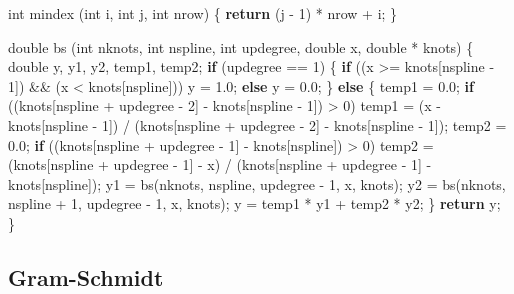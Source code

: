 \documentclass[
  12pt,
]{book}
\newenvironment{Shaded}{\begin{snugshade}}{\end{snugshade}}
\newcommand{\ControlFlowTok}[1]{\textcolor[rgb]{0.13,0.29,0.53}{\textbf{#1}}}
\newcommand{\DataTypeTok}[1]{\textcolor[rgb]{0.13,0.29,0.53}{#1}}
\newcommand{\DecValTok}[1]{\textcolor[rgb]{0.00,0.00,0.81}{#1}}
\newcommand{\FloatTok}[1]{\textcolor[rgb]{0.00,0.00,0.81}{#1}}
\newcommand{\NormalTok}[1]{#1}
\begin{document}
\begin{Shaded}
\begin{Highlighting}[]
\DataTypeTok{int}\NormalTok{ mindex (}\DataTypeTok{int}\NormalTok{ i, }\DataTypeTok{int}\NormalTok{ j, }\DataTypeTok{int}\NormalTok{ nrow) \{}
    \ControlFlowTok{return}\NormalTok{ (j {-} }\DecValTok{1}\NormalTok{) * nrow + i;}
\NormalTok{\}}

\DataTypeTok{double}\NormalTok{ bs (}\DataTypeTok{int}\NormalTok{ nknots, }\DataTypeTok{int}\NormalTok{ nspline, }\DataTypeTok{int}\NormalTok{ updegree, }\DataTypeTok{double}\NormalTok{ x, }\DataTypeTok{double}\NormalTok{ * knots) \{}
    \DataTypeTok{double}\NormalTok{ y, y1, y2, temp1, temp2;}
     \ControlFlowTok{if}\NormalTok{ (updegree == }\DecValTok{1}\NormalTok{) \{}
        \ControlFlowTok{if}\NormalTok{ ((x \textgreater{}= knots[nspline {-} }\DecValTok{1}\NormalTok{]) \&\& (x \textless{} knots[nspline]))}
\NormalTok{            y = }\FloatTok{1.0}\NormalTok{;}
        \ControlFlowTok{else}
\NormalTok{            y = }\FloatTok{0.0}\NormalTok{;}
\NormalTok{     \}}
     \ControlFlowTok{else}\NormalTok{ \{}
\NormalTok{        temp1 = }\FloatTok{0.0}\NormalTok{;}
        \ControlFlowTok{if}\NormalTok{ ((knots[nspline + updegree {-} }\DecValTok{2}\NormalTok{] {-} knots[nspline {-} }\DecValTok{1}\NormalTok{]) \textgreater{} }\DecValTok{0}\NormalTok{)}
\NormalTok{            temp1 = (x {-} knots[nspline {-} }\DecValTok{1}\NormalTok{]) / (knots[nspline + updegree {-} }\DecValTok{2}\NormalTok{] {-} knots[nspline {-} }\DecValTok{1}\NormalTok{]);}
\NormalTok{        temp2 = }\FloatTok{0.0}\NormalTok{;}
        \ControlFlowTok{if}\NormalTok{ ((knots[nspline + updegree {-} }\DecValTok{1}\NormalTok{] {-} knots[nspline]) \textgreater{} }\DecValTok{0}\NormalTok{)}
\NormalTok{            temp2 = (knots[nspline + updegree {-} }\DecValTok{1}\NormalTok{] {-} x) / (knots[nspline + updegree {-} }\DecValTok{1}\NormalTok{] {-} knots[nspline]);}
\NormalTok{        y1 = bs(nknots, nspline, updegree {-} }\DecValTok{1}\NormalTok{, x, knots);}
\NormalTok{        y2 = bs(nknots, nspline + }\DecValTok{1}\NormalTok{, updegree {-} }\DecValTok{1}\NormalTok{, x, knots);}
\NormalTok{        y =  temp1 * y1 + temp2 * y2;}
\NormalTok{    \}}
    \ControlFlowTok{return}\NormalTok{ y;}
\NormalTok{\}}
\end{Highlighting}
\end{Shaded}

\hypertarget{gram-schmidt-1}{%
\subsection{Gram-Schmidt}\label{gram-schmidt-1}}
\end{document}
